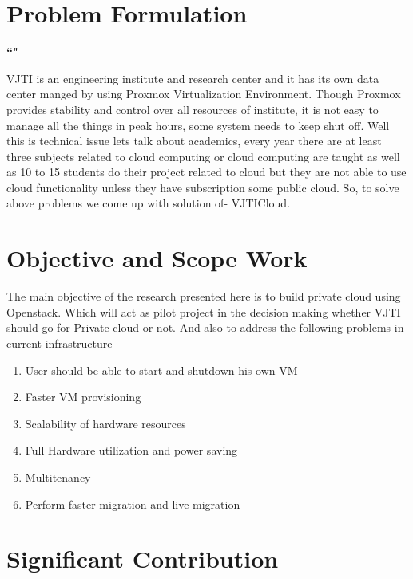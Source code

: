 \section{Problem Formulation}
 \par
 \textbf{\textquotedblleft \@title"}
 
 \par VJTI is an engineering institute and research center and it has its own data center manged by using Proxmox Virtualization Environment. Though Proxmox provides stability and control over all resources of institute, it is not easy to manage all the things in peak hours, some system needs to keep shut off. Well this is technical issue lets talk about academics, every year there are at least three subjects related to cloud computing or cloud computing are taught as well as 10 to 15 students do their project related to cloud but they are not able to use cloud functionality unless they have subscription some public cloud. So, to solve above problems we come up with solution of- VJTICloud.

\section{Objective and Scope Work}

The main objective of the research presented here is to build private cloud using Openstack\cite{openstack}. Which will act as pilot project in the decision making whether VJTI should go for Private cloud or not. And also to address the following problems in current infrastructure 

\begin{enumerate}
  \item User should be able to start and shutdown his own VM
  \item Faster VM provisioning
  \item Scalability of hardware resources
  \item Full Hardware utilization and power saving %
  \item Multitenancy %
  \item Perform faster migration and live migration %
\end{enumerate}


\section{Significant Contribution}

